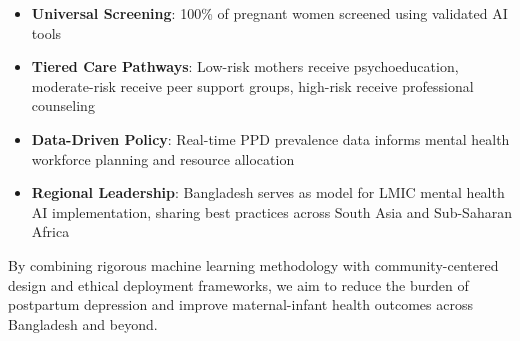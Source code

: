 \begin{itemize}
    \item \textbf{Universal Screening}: 100\% of pregnant women screened using validated AI tools
    \item \textbf{Tiered Care Pathways}: Low-risk mothers receive psychoeducation, moderate-risk receive peer support groups, high-risk receive professional counseling
    \item \textbf{Data-Driven Policy}: Real-time PPD prevalence data informs mental health workforce planning and resource allocation
    \item \textbf{Regional Leadership}: Bangladesh serves as model for LMIC mental health AI implementation, sharing best practices across South Asia and Sub-Saharan Africa
\end{itemize}

By combining rigorous machine learning methodology with community-centered design and ethical deployment frameworks, we aim to reduce the burden of postpartum depression and improve maternal-infant health outcomes across Bangladesh and beyond.

